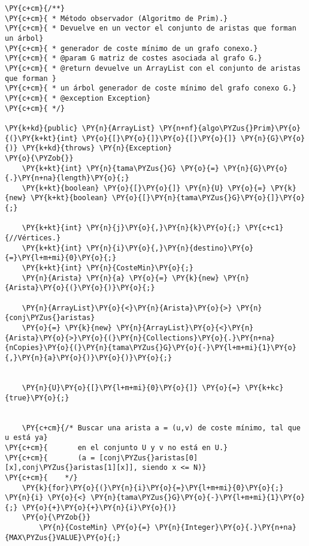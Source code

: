 \begin{Verbatim}[commandchars=\\\{\}]
\PY{c+cm}{/**}
\PY{c+cm}{ * Método observador (Algoritmo de Prim).}
\PY{c+cm}{ * Devuelve en un vector el conjunto de aristas que forman un árbol}
\PY{c+cm}{ * generador de coste mínimo de un grafo conexo.}
\PY{c+cm}{ * @param G matriz de costes asociada al grafo G.}
\PY{c+cm}{ * @return devuelve un ArrayList con el conjunto de aristas que forman }
\PY{c+cm}{ * un árbol generador de coste mínimo del grafo conexo G.}
\PY{c+cm}{ * @exception Exception}
\PY{c+cm}{ */}

\PY{k+kd}{public} \PY{n}{ArrayList} \PY{n+nf}{algo\PYZus{}Prim}\PY{o}{(}\PY{k+kt}{int} \PY{o}{[}\PY{o}{]}\PY{o}{[}\PY{o}{]} \PY{n}{G}\PY{o}{)} \PY{k+kd}{throws} \PY{n}{Exception}
\PY{o}{\PYZob{}}
    \PY{k+kt}{int} \PY{n}{tama\PYZus{}G} \PY{o}{=} \PY{n}{G}\PY{o}{.}\PY{n+na}{length}\PY{o}{;}
    \PY{k+kt}{boolean} \PY{o}{[}\PY{o}{]} \PY{n}{U} \PY{o}{=} \PY{k}{new} \PY{k+kt}{boolean} \PY{o}{[}\PY{n}{tama\PYZus{}G}\PY{o}{]}\PY{o}{;}
	
    \PY{k+kt}{int} \PY{n}{j}\PY{o}{,}\PY{n}{k}\PY{o}{;} \PY{c+c1}{//Vértices.}
    \PY{k+kt}{int} \PY{n}{i}\PY{o}{,}\PY{n}{destino}\PY{o}{=}\PY{l+m+mi}{0}\PY{o}{;}
    \PY{k+kt}{int} \PY{n}{CosteMin}\PY{o}{;}
    \PY{n}{Arista} \PY{n}{a} \PY{o}{=} \PY{k}{new} \PY{n}{Arista}\PY{o}{(}\PY{o}{)}\PY{o}{;}

    \PY{n}{ArrayList}\PY{o}{<}\PY{n}{Arista}\PY{o}{>} \PY{n}{conj\PYZus{}aristas} 
	\PY{o}{=} \PY{k}{new} \PY{n}{ArrayList}\PY{o}{<}\PY{n}{Arista}\PY{o}{>}\PY{o}{(}\PY{n}{Collections}\PY{o}{.}\PY{n+na}{nCopies}\PY{o}{(}\PY{n}{tama\PYZus{}G}\PY{o}{-}\PY{l+m+mi}{1}\PY{o}{,}\PY{n}{a}\PY{o}{)}\PY{o}{)}\PY{o}{;}


    \PY{n}{U}\PY{o}{[}\PY{l+m+mi}{0}\PY{o}{]} \PY{o}{=} \PY{k+kc}{true}\PY{o}{;}
	

    \PY{c+cm}{/* Buscar una arista a = (u,v) de coste mínimo, tal que u está ya}
\PY{c+cm}{       en el conjunto U y v no está en U.}
\PY{c+cm}{       (a = [conj\PYZus{}aristas[0][x],conj\PYZus{}aristas[1][x]], siendo x <= N)}
\PY{c+cm}{    */}
    \PY{k}{for}\PY{o}{(}\PY{n}{i}\PY{o}{=}\PY{l+m+mi}{0}\PY{o}{;} \PY{n}{i} \PY{o}{<} \PY{n}{tama\PYZus{}G}\PY{o}{-}\PY{l+m+mi}{1}\PY{o}{;} \PY{o}{+}\PY{o}{+}\PY{n}{i}\PY{o}{)}
	\PY{o}{\PYZob{}}
	    \PY{n}{CosteMin} \PY{o}{=} \PY{n}{Integer}\PY{o}{.}\PY{n+na}{MAX\PYZus{}VALUE}\PY{o}{;}


\end{Verbatim}
